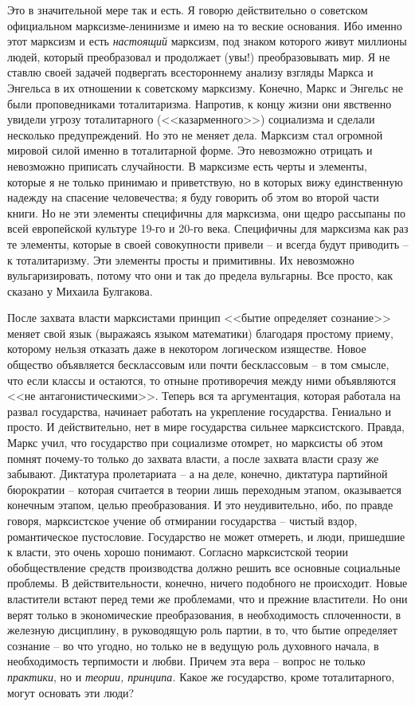 \documentclass{book}
\begin{document}
Это в значительной мере так и есть. Я говорю действитель­но о советском официальном марксизме-ленинизме и имею на то веские 
основания. Ибо именно этот марксизм и есть \textit{насто­ящий}  марксизм, под знаком которого живут миллионы людей, который 
преобразовал и продолжает (увы!) преобразовывать мир. Я не ставлю своей задачей подвергать всестороннему ана­лизу взгляды Маркса 
и Энгельса в их отношении к советскому марксизму. Конечно, Маркс и Энгельс не были проповедниками тоталитаризма. Напротив, к 
концу жизни они явственно увиде­ли угрозу тоталитарного (<<казарменного>>) социализма и сдела­ли несколько предупреждений. Но это не 
меняет дела. Марк­сизм стал огромной мировой силой именно в тоталитарной фор­ме. Это невозможно отрицать и невозможно приписать 
случай­ности. В марксизме есть черты и элементы, которые я не толь­ко принимаю и приветствую, но в которых вижу единственную 
надежду на спасение человечества; я буду говорить об этом во второй части книги. Но не эти элементы специфичны  для марксизма, 
они щедро рассыпаны по всей европейской культуре 19-го и 20-го века. Специфичны для марксизма как раз те эле­менты, которые в 
своей совокупности привели -- и всегда будут приводить -- к тоталитаризму. Эти элементы просты и примитивны. Их невозможно 
вульгаризировать, потому что они и так до предела вульгарны. Все просто, как сказано у Михаила Булгакова.


После захвата власти марксистами принцип <<бытие определяет сознание>> меняет свой язык (выражаясь языком мате­матики) благодаря 
простому приему, которому нельзя отказать даже в некотором логическом изяществе. Новое общество объявляется бесклассовым или 
почти бесклассовым -- в том смысле, что если классы и остаются, то отныне противоречия между ними объявляются <<не 
антагонистическими>>. Теперь вся та аргументация, которая работала на развал государства, начинает работать на укрепление 
государства. Гениально и просто. И действительно, нет в мире государства сильнее марк­систского. Правда, Маркс учил, что 
государство при социализ­ме отомрет, но марксисты об этом помнят почему-то только до захвата власти, а после захвата власти сразу 
же забывают. Дик­татура пролетариата -- а на деле, конечно, диктатура партийной бюрократии -- которая считается в теории лишь 
переходным этапом, оказывается конечным этапом, целью преобразования. И это неудивительно, ибо, по правде говоря, марксистское 
уче­ние об отмирании государства -- чистый вздор, романтическое пустословие. Государство не может отмереть, и люди, пришед­шие к 
власти, это очень хорошо понимают. Согласно марксист­ской теории обобществление средств производства должно ре­шить все основные 
социальные проблемы. В действительности, конечно, ничего подобного не происходит. Новые властители встают перед теми же 
проблемами, что и прежние властители. Но они верят только в экономические преобразования, в необ­ходимость сплоченности, в 
железную дисциплину, в руководя­щую роль партии, в то, что бытие определяет сознание -- во что угодно, но только не в ведущую 
роль духовного начала, в необходимость терпимости и любви. Причем эта вера -- вопрос не только \textit{практики},  но и 
\textit{теории, принципа.}  Какое же государст­во, кроме тоталитарного, могут основать эти люди?
\end{document}
